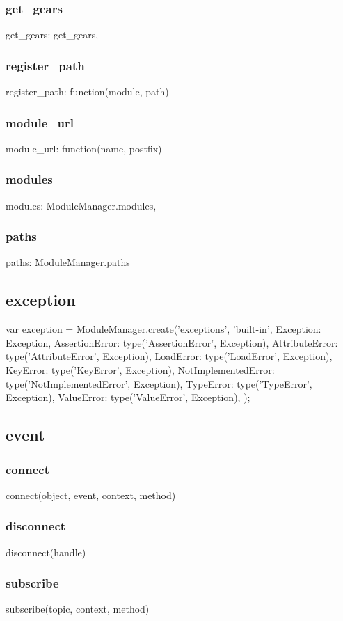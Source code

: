 \subsubsection*{get\_gears}
get\_gears: get_gears,
\subsubsection*{register\_path}
register\_path: function(module, path)
\subsubsection*{module\_url}
module\_url: function(name, postfix) {
\subsubsection*{modules}
modules: ModuleManager.modules,
\subsubsection*{paths}
paths: ModuleManager.paths

\subsection{exception}
var exception = ModuleManager.create('exceptions', 'built-in', {
        Exception: Exception,
        AssertionError: type('AssertionError', Exception),
        AttributeError: type('AttributeError', Exception),
        LoadError: type('LoadError', Exception),
        KeyError: type('KeyError', Exception),
        NotImplementedError: type('NotImplementedError', Exception),
        TypeError: type('TypeError', Exception),
        ValueError: type('ValueError', Exception),
    });

\subsection{event}
\subsubsection*{connect}
connect(object, event, context, method)
\subsubsection*{disconnect}
disconnect(handle)
\subsubsection*{subscribe}
subscribe(topic, context, method)
}
